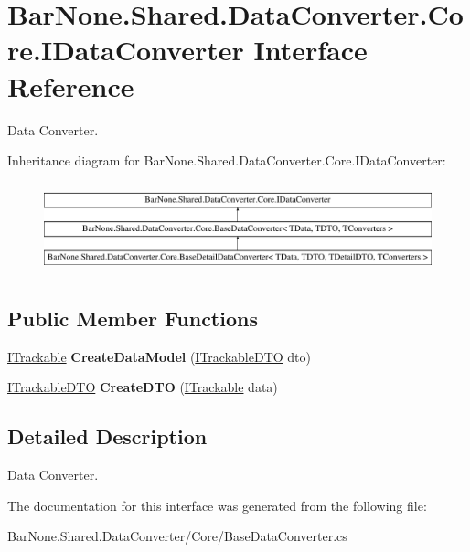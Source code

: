 \hypertarget{interface_bar_none_1_1_shared_1_1_data_converter_1_1_core_1_1_i_data_converter}{}\section{Bar\+None.\+Shared.\+Data\+Converter.\+Core.\+I\+Data\+Converter Interface Reference}
\label{interface_bar_none_1_1_shared_1_1_data_converter_1_1_core_1_1_i_data_converter}


Data Converter.  


Inheritance diagram for Bar\+None.\+Shared.\+Data\+Converter.\+Core.\+I\+Data\+Converter\+:\begin{figure}[H]
\begin{center}
\leavevmode
\includegraphics[height=2.654028cm]{interface_bar_none_1_1_shared_1_1_data_converter_1_1_core_1_1_i_data_converter}
\end{center}
\end{figure}
\subsection*{Public Member Functions}
\begin{DoxyCompactItemize}
\item 
\mbox{\label{interface_bar_none_1_1_shared_1_1_data_converter_1_1_core_1_1_i_data_converter_a38c9ac3dcf20367ed953c407779d6f54}} 
\mbox{\hyperlink{interface_bar_none_1_1_shared_1_1_core_1_1_i_trackable}{I\+Trackable}} {\bfseries Create\+Data\+Model} (\mbox{\hyperlink{interface_bar_none_1_1_shared_1_1_core_1_1_i_trackable_d_t_o}{I\+Trackable\+D\+TO}} dto)
\item 
\mbox{\label{interface_bar_none_1_1_shared_1_1_data_converter_1_1_core_1_1_i_data_converter_ab9d348baa4a8128065c97f0fcd6a9d08}} 
\mbox{\hyperlink{interface_bar_none_1_1_shared_1_1_core_1_1_i_trackable_d_t_o}{I\+Trackable\+D\+TO}} {\bfseries Create\+D\+TO} (\mbox{\hyperlink{interface_bar_none_1_1_shared_1_1_core_1_1_i_trackable}{I\+Trackable}} data)
\end{DoxyCompactItemize}


\subsection{Detailed Description}
Data Converter. 



The documentation for this interface was generated from the following file\+:\begin{DoxyCompactItemize}
\item 
Bar\+None.\+Shared.\+Data\+Converter/\+Core/Base\+Data\+Converter.\+cs\end{DoxyCompactItemize}

